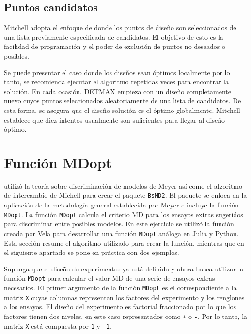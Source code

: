 \subsection{Puntos candidatos}

Mitchell adopta el enfoque de \cite{dykstra1971augmentation} donde los puntos de diseño son seleccionados de una lista previamente especificada de candidatos. El objetivo de esto es la facilidad de programación y el poder de exclusión de puntos no deseados o posibles. 

Se puede presentar el caso donde los diseños sean óptimos localmente por lo tanto, se recomienda ejecutar el algoritmo repetidas veces para encontrar la solución. En cada ocasión, DETMAX empieza con un diseño completamente nuevo cuyos puntos seleccionados aleatoriamente de una lista de candidatos. De esta forma, se asegura que el diseño solución es el óptimo globalmente. Mitchell establece que diez intentos usualmente son suficientes para llegar al diseño óptimo. 

\section{Función MDopt}
\cite{tesis_paty} utilizó la teoría sobre discriminación de modelos de Meyer así como el algoritmo de intercambio de Michell para crear el paquete \texttt{BsMD2}. El paquete se enfoca en la aplicación de la metodología general establecida por Meyer e incluye la función \texttt{MDopt}. La función \texttt{MDopt} calcula el criterio MD para los ensayos extras sugeridos para discriminar entre posibles modelos. En este ejercicio se utilizó la función creada por Vela para desarrollar una función \texttt{MDopt} análoga en \textsf{Julia} y \textsf{Python}. Esta sección resume el algoritmo utilizado para crear la función, mientras que en el siguiente apartado se pone en práctica con dos ejemplos. 

Suponga que el diseño de experimentos ya está definido y ahora busca utilizar la función \texttt{MDopt} para calcular el valor MD de una serie de ensayos extras necesarios. El primer argumento de la función \texttt{MDopt} es el correspondiente a la matriz \texttt{X} cuyas columnas representan los factores del experimento y los renglones a los ensayos. El diseño del experimento es factorial fraccionado por lo que los factores tienen dos niveles, en este caso representados como \texttt{+} o \texttt{-}. Por lo tanto, la matriz \texttt{X} está compuesta por \texttt{1} y  \texttt{-1}. 

